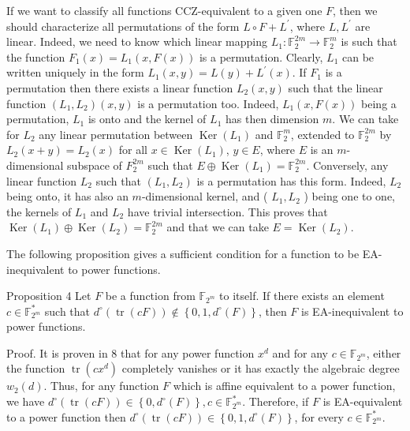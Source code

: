 \documentclass[10pt]{article}
\begin{document}
If we want to classify all functions CCZ-equivalent to a given one $F$, then we should characterize all permutations of the form $L \circ F+L^{\prime}$, where $L, L^{\prime}$ are linear. Indeed, we need to know which linear mapping $L_{1}: \mathbb{F}_{2}^{2 m} \rightarrow \mathbb{F}_{2}^{m}$ is such that the function $F_{1}(x)=L_{1}(x, F(x))$ is a permutation. Clearly, $L_{1}$ can be written uniquely in the form $L_{1}(x, y)=L(y)+L^{\prime}(x)$. If $F_{1}$ is a permutation then there exists a linear function $L_{2}(x, y)$ such that the linear function $\left(L_{1}, L_{2}\right)(x, y)$ is a permutation too. Indeed, $L_{1}(x, F(x))$ being a permutation, $L_{1}$ is onto and the kernel of $L_{1}$ has then dimension $m$. We can take for $L_{2}$ any linear permutation between $\operatorname{Ker}\left(L_{1}\right)$ and $\mathbb{F}_{2}^{m}$, extended to $\mathbb{F}_{2}^{2 m}$ by $L_{2}(x+y)=L_{2}(x)$ for all $x \in \operatorname{Ker}\left(L_{1}\right)$, $y \in E$, where $E$ is an $m$-dimensional subspace of $F_{2}^{2 m}$ such that $E \oplus \operatorname{Ker}\left(L_{1}\right)=\mathbb{F}_{2}^{2 m}$. Conversely, any linear function $L_{2}$ such that $\left(L_{1}, L_{2}\right)$ is a permutation has this form. Indeed, $L_{2}$ being onto, it has also an $m$-dimensional kernel, and ( $L_{1}, L_{2}$ ) being one to one, the kernels of $L_{1}$ and $L_{2}$ have trivial intersection. This proves that $\operatorname{Ker}\left(L_{1}\right) \oplus \operatorname{Ker}\left(L_{2}\right)=\mathbb{F}_{2}^{2 m}$ and that we can take $E=\operatorname{Ker}\left(L_{2}\right)$.

The following proposition gives a sufficient condition for a function to be EA-inequivalent to power functions.

Proposition 4 Let $F$ be a function from $\mathbb{F}_{2^{m}}$ to itself. If there exists an element $c \in \mathbb{F}_{2^{m}}^{*}$ such that $d^{\circ}(\operatorname{tr}(c F)) \notin\left\{0,1, d^{\circ}(F)\right\}$, then $F$ is EA-inequivalent to power functions.

Proof. It is proven in 8 that for any power function $x^{d}$ and for any $c \in \mathbb{F}_{2^{m}}$, either the function $\operatorname{tr}\left(c x^{d}\right)$ completely vanishes or it has exactly the algebraic degree $w_{2}(d)$. Thus, for any function $F$ which is affine equivalent to a power function, we have $d^{\circ}(\operatorname{tr}(c F)) \in \left\{0, d^{\circ}(F)\right\}, c \in \mathbb{F}_{2^{m}}^{*}$. Therefore, if $F$ is EA-equivalent to a power function then $d^{\circ}(\operatorname{tr}(c F)) \in \left\{0,1, d^{\circ}(F)\right\}$, for every $c \in \mathbb{F}_{2^{m}}^{*}$.
\end{document}
